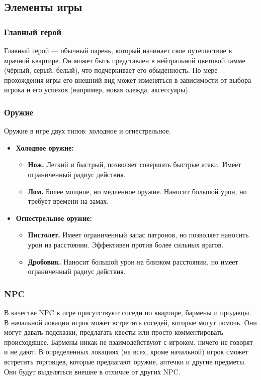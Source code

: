 \documentclass[12pt]{article}
\begin{document}
    \subsection{Элементы игры}
    \subsubsection{Главный герой}
Главный герой — обычный парень, который начинает свое путешествие в мрачной квартире. Он может быть представлен в нейтральной цветовой гамме (чёрный, серый, белый), что подчеркивает его обыденность. По мере прохождения игры его внешний вид может изменяться в зависимости от выбора игрока и его успехов (например, новая одежда, аксессуары).

\subsubsection{Оружие}
Оружие в игре двух типов: холодное и огнестрельное.

\begin{itemize}
    \item \textbf{Холодное оружие:}
    \begin{itemize}
        \item \textbf{Нож.} Легкий и быстрый, позволяет совершать быстрые атаки. Имеет ограниченный радиус действия.
        \item \textbf{Лом.} Более мощное, но медленное оружие. Наносит большой урон, но требует времени на замах.
    \end{itemize}
    \item \textbf{Огнестрельное оружие:}
    \begin{itemize}
        \item \textbf{Пистолет.} Имеет ограниченный запас патронов, но позволяет наносить урон на расстоянии. Эффективен против более сильных врагов.
        \item \textbf{Дробовик.} Наносит большой урон на близком расстоянии, но имеет ограниченный радиус действия.
    \end{itemize}
\end{itemize}

\subsubsection{NPC}
В качестве NPC в игре присутствуют соседи по квартире, бармены и продавцы. В начальной локации игрок может встретить соседей, которые могут помочь. Они могут давать подсказки, предлагать квесты или просто комментировать происходящее. Бармены никак не взаимодействуют с игроком, ничего не говорят и не дают. В определенных локациях (на всех, кроме начальной) игрок сможет встретить торговцев, которые предлагают оружие, аптечки и другие предметы. Они будут выделяться внешне в отличие от других NPC.
\end{document}

